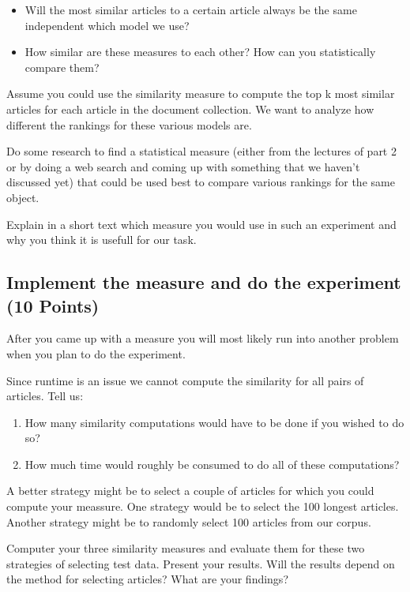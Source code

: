\documentclass{WeSTassignment}
\begin{document}
\begin{itemize}
\item Will the most similar articles to a certain article always be the same independent which model we use?
\item How similar are these measures to each other? How can you statistically compare them?
\end{itemize}

Assume you could use the similarity measure to compute the top k most similar articles for each article in the document collection. We want to analyze how different the rankings for these various models are. 

Do some research to find a statistical measure (either from the lectures of part 2 or by doing a web search and coming up with something that we haven't discussed yet) that could be used best to compare various rankings for the same object. 

Explain in a short text which measure you would use in such an experiment and why you think it is usefull for our task. 

\subsection{Implement the measure and do the experiment (10 Points)}
After you came up with a measure you will most likely run into another problem when you plan to do the experiment. 

Since runtime is an issue we cannot compute the similarity for all pairs of articles. Tell us: 
\begin{enumerate}
\item How many similarity computations would have to be done if you wished to do so? 
\item How much time would roughly be consumed to do all of these computations?
\end{enumerate}

A better strategy might be to select a couple of articles for which you could compute your meassure. One strategy would be to select the 100 longest articles. Another strategy might be to randomly select 100 articles from our corpus. 

Computer your three similarity measures and evaluate them for these two strategies of selecting test data. Present your results. Will the results depend on the method for selecting articles? What are your findings?
\end{document}

